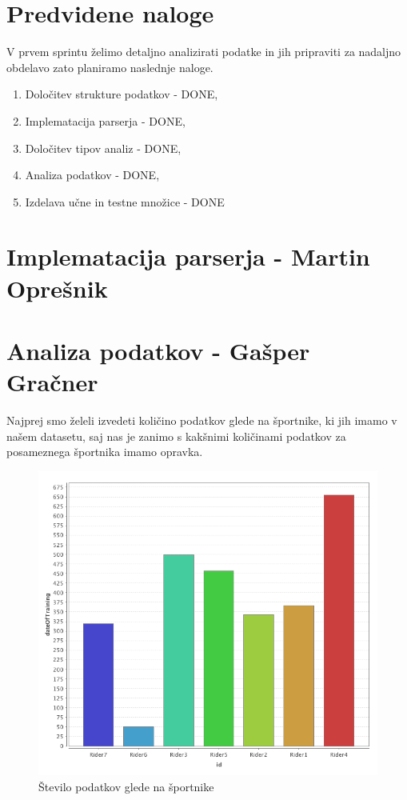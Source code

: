 \documentclass[a4paper,11pt]{article}
\begin{document}
\section{Predvidene naloge}
V prvem sprintu želimo detaljno analizirati podatke in jih pripraviti za nadaljno obdelavo zato planiramo naslednje naloge.
	\begin{enumerate}
		\item{Določitev strukture podatkov - \textcolor{OliveGreen}{DONE},}
		\item{Implematacija parserja - \textcolor{OliveGreen}{DONE},}
		\item{Določitev tipov analiz - \textcolor{OliveGreen}{DONE},}
		\item{Analiza podatkov - \textcolor{OliveGreen}{DONE},}
		\item{Izdelava učne in testne množice - \textcolor{OliveGreen}{DONE}}
	\end{enumerate}
\newpage

\section{Implematacija parserja - Martin Oprešnik}


\newpage
\section{Analiza podatkov - Gašper Gračner}
Najprej smo želeli izvedeti količino podatkov glede na športnike, ki jih imamo v našem datasetu, saj nas je zanimo s kakšnimi količinami podatkov za posameznega športnika imamo opravka. \\

\begin{figure}[H]
\caption{Število podatkov glede na športnike}
\centering
\includegraphics[width=1\textwidth]{ridersTrainingsCount}
\end{figure}
\end{document}
